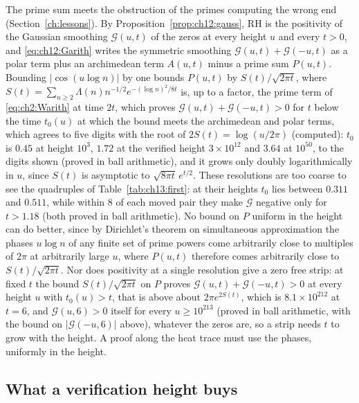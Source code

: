 The prime sum meets the obstruction of the primes computing the wrong end (Section~\ref{ch:lessons}). By Proposition~\ref{prop:ch12:gauss}, RH is the positivity of the Gaussian smoothing $\mathcal G(u,t)$ of the zeros at every height $u$ and every $t>0$, and \eqref{eq:ch12:Garith} writes the symmetric smoothing $\mathcal G(u,t)+\mathcal G(-u,t)$ as a polar term plus an archimedean term $A(u,t)$ minus a prime sum $P(u,t)$. Bounding $|\cos(u\log n)|$ by one bounds $P(u,t)$ by $S(t)/\sqrt{2\pi t}$, where $S(t)=\sum_{n\ge2}\Lambda(n)n^{-1/2}e^{-(\log n)^2/8t}$ is, up to a factor, the prime term of \eqref{eq:ch2:Warith} at time $2t$, which proves $\mathcal G(u,t)+\mathcal G(-u,t)>0$ for $t$ below the time $t_0(u)$ at which the bound meets the archimedean and polar terms, which agrees to five digits with the root of $2S(t)=\log(u/2\pi)$ (computed): $t_0$ is $0.45$ at height $10^3$, $1.72$ at the verified height $3\times10^{12}$ and $3.64$ at $10^{50}$, to the digits shown (proved in ball arithmetic), and it grows only doubly logarithmically in $u$, since $S(t)$ is asymptotic to $\sqrt{8\pi t}\,e^{t/2}$. These resolutions are too coarse to see the quadruples of Table~\ref{tab:ch13:first}: at their heights $t_0$ lies between $0.311$ and $0.511$, while within $8$ of each moved pair they make $\mathcal G$ negative only for $t>1.18$ (both proved in ball arithmetic). No bound on $P$ uniform in the height can do better, since by Dirichlet's theorem on simultaneous approximation the phases $u\log n$ of any finite set of prime powers come arbitrarily close to multiples of $2\pi$ at arbitrarily large $u$, where $P(u,t)$ therefore comes arbitrarily close to $S(t)/\sqrt{2\pi t}$. Nor does positivity at a single resolution give a zero free strip: at fixed $t$ the bound $S(t)/\sqrt{2\pi t}$ on $P$ proves $\mathcal G(u,t)+\mathcal G(-u,t)>0$ at every height $u$ with $t_0(u)>t$, that is above about $2\pi e^{2S(t)}$, which is $8.1\times10^{212}$ at $t=6$, and $\mathcal G(u,6)>0$ itself for every $u\ge10^{213}$ (proved in ball arithmetic, with the bound on $|\mathcal G(-u,6)|$ above), whatever the zeros are, so a strip needs $t$ to grow with the height. A proof along the heat trace must use the phases, uniformly in the height.

\subsection{What a verification height buys}\label{sec:ch12:reach}

